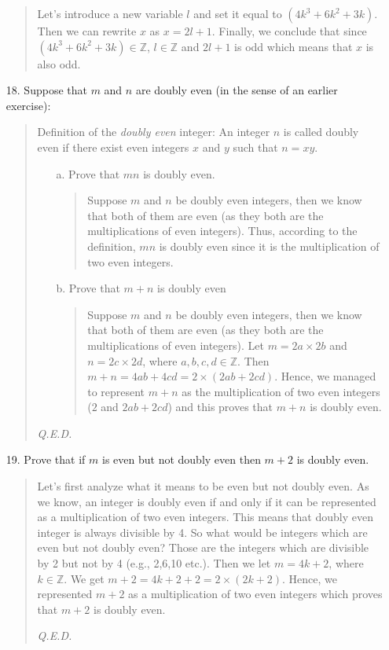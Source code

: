 \documentclass[12pt, a4paper]{article}                      %
\begin{document}
\begin{enumerate}
\begin{quote}
Let's introduce a new variable $l$ and set it equal to $(4k^3 + 6k^2 + 3k)$.
Then we can rewrite $x$ as $x = 2l + 1$. Finally, we conclude that since
$(4k^3 + 6k^2 + 3k) \in \mathbb{Z}$, $l \in \mathbb{Z}$ and $2l + 1$ is odd which
means that $x$ is also odd.
\end{quote}

\item[18.]
Suppose that $m$ and $n$ are doubly even (in the sense of an earlier exercise):
\begin{quote}
Definition of the \textit{doubly even} integer: An integer $n$ is called doubly even if there exist even integers $x$ and $y$ such that $n = xy$.\\

\begin{itemize}
\item[a.]
Prove that $mn$ is doubly even.
\begin{quote}
Suppose $m$ and $n$ be doubly even integers, then we know that both of them are even (as they both are the multiplications of even integers).
Thus, according to the definition, $mn$ is doubly even since it is the multiplication of two even integers.
\end{quote}

\item[b.]
Prove that $m + n$ is doubly even
\begin{quote}
Suppose $m$ and $n$ be doubly even integers, then we know that both of them are even (as they both are the multiplications of even integers).
Let $m = 2a \times 2b$ and $n = 2c \times 2d$, where $a,b,c,d \in \mathbb{Z}$. Then $m + n = 4ab + 4cd = 2 \times (2ab + 2cd)$. Hence, we managed to represent
$m + n$ as the multiplication of two even integers ($2$ and $2ab + 2cd$) and this proves that $m + n$ is doubly even.
\end{quote}
\end{itemize}
\begin{flushright}
\textit{Q.E.D.}
\end{flushright}
\end{quote}

\item[19.]
Prove that if $m$ is even but not doubly even then $m + 2$ is doubly even.
\begin{quote}
Let's first analyze what it means to be even but not doubly even. As we know, an integer
is doubly even if and only if it can be represented as a multiplication of two even integers.
This means that doubly even integer is always divisible by 4. So what would be integers which are even
but not doubly even? Those are the integers which are divisible by 2 but not by 4 (e.g., 2,6,10 etc.).
Then we let $m = 4k + 2$, where $k \in \mathbb{Z}$. We get $m + 2 = 4k + 2 + 2 = 2 \times (2k + 2)$.
Hence, we represented $m + 2$ as a multiplication of two even integers which proves that $m + 2$ is
doubly even.
\begin{flushright}
\textit{Q.E.D.}
\end{flushright}
\end{quote}


\end{enumerate}
\end{document}
